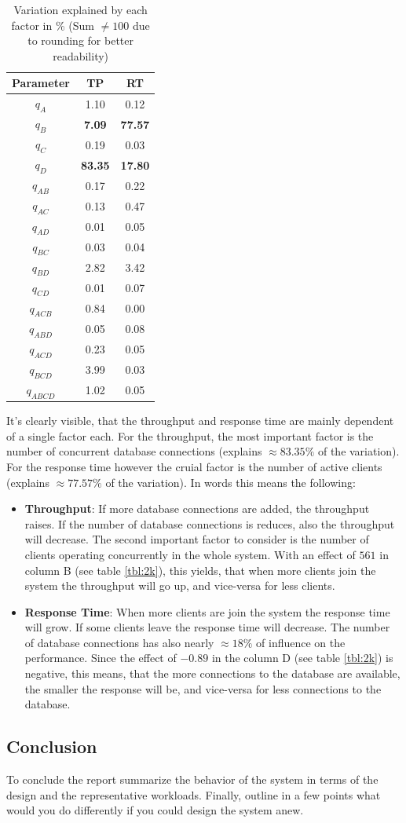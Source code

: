 \documentclass[11pt]{article}
\begin{document}
\begin{table}
\centering
\caption{Variation explained by each factor in \% (Sum $\neq100$ due to rounding for better readability)}
\label{tbl:2k_percentages}
\begin{tabular}{ccc}
	Parameter & TP & RT \\ \hline
	$q_{A}$ & 1.10  & 0.12  \\
	$q_{B}$ & \textbf{7.09} & \textbf{77.57}  \\
	$q_{C}$ & 0.19 & 0.03  \\
	$q_{D}$ & \textbf{83.35} & \textbf{17.80} \\
	$q_{AB}$ & 0.17 & 0.22  \\
	$q_{AC}$ & 0.13  & 0.47  \\
	$q_{AD}$ & 0.01  & 0.05  \\
	$q_{BC}$ & 0.03  & 0.04  \\
	$q_{BD}$ & 2.82  & 3.42 \\
	$q_{CD}$ & 0.01  & 0.07  \\
	$q_{ACB}$ & 0.84  & 0.00  \\
	$q_{ABD}$ & 0.05  & 0.08  \\
	$q_{ACD}$ & 0.23  & 0.05  \\
	$q_{BCD}$ & 3.99  & 0.03  \\
	$q_{ABCD}$ & 1.02  & 0.05  \\
\end{tabular}
\end{table}
It's clearly visible, that the throughput and response time are mainly dependent of a single factor each. For the throughput, the most important factor is the number of concurrent database connections (explains $\approx83.35\%$ of the variation). For the response time however the cruial factor is the number of active clients (explains $\approx77.57\%$ of the variation). In words this means the following:
\begin{itemize}
	\item \textbf{Throughput}: If more database connections are added, the throughput raises. If the number of database connections is reduces, also the throughput will decrease. The second important factor to consider is the number of clients operating concurrently in the whole system. With an effect of $561$ in column B (see table \ref{tbl:2k}), this yields, that when more clients join the system the throughput will go up, and vice-versa for less clients.
	\item \textbf{Response Time}: When more clients are join the system the response time will grow. If some clients leave the response time will decrease. The number of database connections has also nearly $\approx18\%$ of influence on the performance. Since the effect of $-0.89$ in the column D (see table \ref{tbl:2k}) is negative, this means, that the more connections to the database are available, the smaller the response will be, and vice-versa for less connections to the database.
\end{itemize}
\subsection{Conclusion}\label{sec:conclusion}

To conclude the report summarize the behavior of the system in terms of
the design and the representative workloads. Finally, outline in a few
points what would you do differently if you could design the system
anew.
\end{document}
